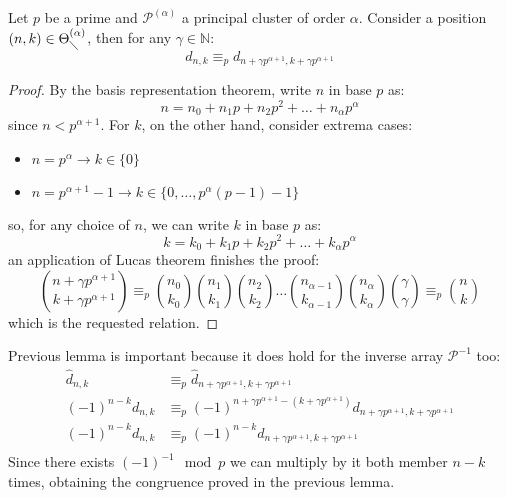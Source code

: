 \begin{lemma}
    Let $p$ be a prime and $\mathcal{P}^{(\alpha)}$ a principal cluster of order $\alpha$.
    Consider a position $(n,k)\in \Theta_{\diagdown}^{(\alpha)}$, then for any $\gamma\in\mathbb{N}$:
    \begin{displaymath}
        d_{n,k} \equiv_{p} d_{n+\gamma p^{\alpha+1}, k+\gamma p^{\alpha+1}}
    \end{displaymath}
\end{lemma}
\begin{proof} %
    By the basis representation theorem, write $n$ in base $p$ as:
    \begin{displaymath}
        n = n_{0} + n_{1}p + n_{2}p^2 + \ldots + n_{\alpha}p^\alpha %
    \end{displaymath}
    since $n<p^{\alpha+1}$. For $k$, on the other hand, consider extrema cases:
    \begin{itemize}
        \item $n=p^{\alpha}\rightarrow k\in\lbrace0\rbrace$
        \item $n=p^{\alpha+1}-1 \rightarrow k\in\lbrace 0,\ldots,p^{\alpha}(p-1)-1\rbrace$
    \end{itemize}
    so, for any choice of $n$, we can write $k$ in base $p$ as:
    \begin{displaymath}
        k = k_{0} + k_{1}p + k_{2}p^2 + \ldots + k_{\alpha}p^\alpha %
    \end{displaymath}
    an application of Lucas theorem finishes the proof:
    \begin{displaymath}
        {{n+\gamma p^{\alpha+1}} \choose { k+\gamma p^{\alpha+1}}} \equiv_{p} 
            {{n_{0}} \choose {k_{0}}}  
            {{n_{1}} \choose {k_{1}}} 
            {{n_{2}} \choose {k_{2}}}
            \ldots
            {{n_{\alpha-1}} \choose {k_{\alpha-1}} }
            {{n_{\alpha}} \choose {k_{\alpha}} }
            {{\gamma} \choose {\gamma}} 
            \equiv_{p}{{n} \choose {k}}  
    \end{displaymath}
    which is the requested relation.
\end{proof}

Previous lemma is important because it does hold for the inverse array $\mathcal{P}^{-1}$ too:
\begin{displaymath}
    \begin{split}
        \hat{d}_{n,k} &\equiv_{p} \hat{d}_{n+\gamma p^{\alpha+1}, k+\gamma p^{\alpha+1}} \\
        (-1)^{n-k}d_{n,k} &\equiv_{p} (-1)^{n+\gamma p^{\alpha+1}-(k+\gamma p^{\alpha+1})}d_{n+\gamma p^{\alpha+1}, k+\gamma p^{\alpha+1}} \\
        (-1)^{n-k}d_{n,k} &\equiv_{p} (-1)^{n-k}d_{n+\gamma p^{\alpha+1}, k+\gamma p^{\alpha+1}} \\
    \end{split}
\end{displaymath}
Since there exists $(-1)^{-1}\mod p$ we can multiply by it both member $n-k$ times,
obtaining the congruence proved in the previous lemma.

